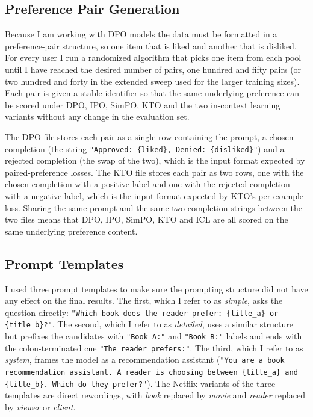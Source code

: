 \subsection{Preference Pair Generation}
\label{sec:pair-gen}

Because I am working with DPO models the data must be formatted in a preference-pair structure, so one item that is liked and another that is disliked. For every user I run a randomized algorithm that picks one item from each pool until I have reached the desired number of pairs, one hundred and fifty pairs (or two hundred and forty in the extended sweep used for the larger training sizes). Each pair is given a stable identifier so that the same underlying preference can be scored under
DPO, IPO, SimPO, KTO and the two in-context learning variants without any change in the evaluation set.

The DPO file stores each pair as a single row containing the prompt, a chosen completion (the string \texttt{"Approved: \{liked\}, Denied: \{disliked\}"}) and a rejected completion (the swap of the two), which is the input format expected by paired-preference losses. The KTO file stores each pair as two rows, one with the chosen completion with a positive label and one with the rejected completion with a negative label, which is the input format expected by KTO's per-example loss. Sharing the same prompt and the same two completion strings between the two files means that DPO, IPO, SimPO, KTO and ICL are all scored on the same underlying preference content.

\subsection{Prompt Templates}
\label{sec:prompts}

I used three prompt templates to make sure the prompting structure did not have any effect on the final results. The first, which I refer to as \textit{simple}, asks the question directly: \texttt{"Which book does the reader prefer: \{title\_a\} or \{title\_b\}?"}. The second, which I refer to as \textit{detailed}, uses a similar structure but prefixes the candidates with \texttt{"Book A:"} and \texttt{"Book B:"} labels and ends with the colon-terminated cue \texttt{"The reader prefers:"}. The third, which I refer to as \textit{system}, frames the model as a recommendation assistant (\texttt{"You are a book recommendation assistant. A reader is choosing between \{title\_a\} and \{title\_b\}. Which do they prefer?"}). The Netflix variants of the three templates are direct rewordings, with \textit{book} replaced by \textit{movie} and \textit{reader} replaced by \textit{viewer} or \textit{client}.

